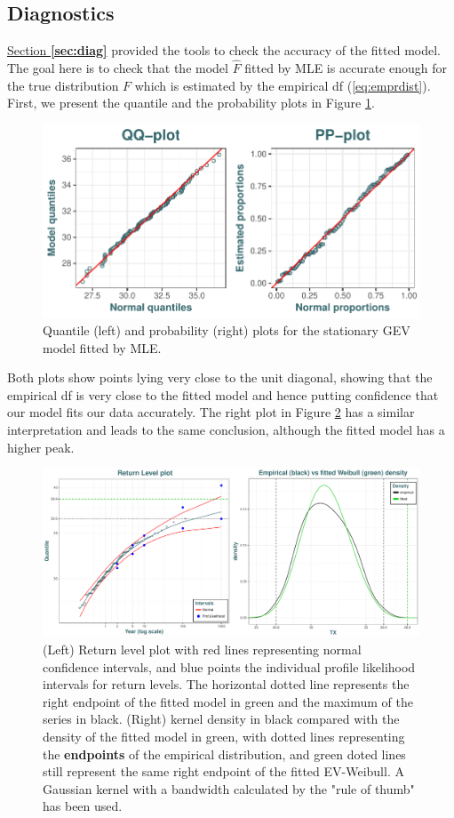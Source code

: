 \subsection{Diagnostics}

\hyperref[sec:diag]{Section \textbf{\ref{sec:diag}}} provided the tools to check the accuracy of the fitted model. The goal here is to check that the
model $\hat{F}$ fitted by MLE is accurate enough for the true distribution $F$ which is estimated by the empirical df
(\ref{eq:emprdist}). First, we present the quantile and the probability plots in Figure \ref{fig:ppqqplot}.

\begin{figure}[!htb]
	\centering	\includegraphics[width=.7\linewidth]{pp_qqplot.pdf}\caption{Quantile (left) and probability (right) plots for the stationary GEV model fitted by MLE.}\label{fig:ppqqplot}
\end{figure}

Both plots show points lying very close to the unit diagonal, showing that the empirical df is very close to the fitted model and hence putting confidence that our model fits our data accurately.
The right plot in Figure \ref{fig:rl_empdes} has a similar interpretation and leads to the same conclusion, although the fitted model has a higher peak.

\begin{figure}[!htb]
	\centering	\includegraphics[width=.75\linewidth]{rl_empdes.pdf}\caption{(Left) Return level plot with red lines representing normal confidence intervals, and blue points the individual profile likelihood intervals for return levels. The horizontal dotted line represents the right endpoint of the	fitted model in green and the maximum of the series in black. (Right) kernel density in black compared with the density of the fitted model in green, with dotted lines representing the \textbf{endpoints} of the empirical distribution, and green doted lines still represent the same right endpoint of the fitted EV-Weibull. A Gaussian kernel with a bandwidth calculated by the \citet[pp.48, (3.31)]{silverman_1986} "rule of thumb" has been used.}\label{fig:rl_empdes}
\end{figure}


